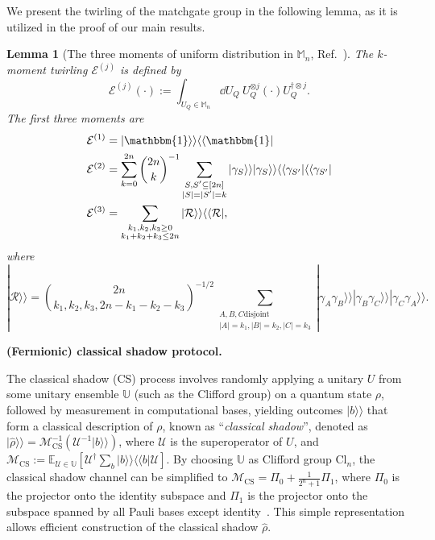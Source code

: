 \documentclass[showpacs,onecolumn,aps,prx,long bibliography,superscriptaddress,notitlepage]{revtex4-1}
\newtheorem{lemma}{Lemma}
\newcommand{\supket}[1]{|#1 \rangle\rangle}
\newcommand{\supbra}[1]{\langle\langle #1 |}
\newcommand{\sbra}[1]{\left[ #1 \right]}
\newcommand{\Ecal}{\mathcal{E}}
\newcommand{\Rcal}{\mathcal{R}}
\newcommand{\Ucal}{\mathcal{U}}
\newcommand{\Mcal}{\mathcal{M}}
\newcommand{\Ubb}{\mathbb{U}}
\newcommand{\Mbb}{\mathbb{M}}
\newcommand{\Ebb}{\mathbb{E}}
\begin{document}
We present the twirling of the matchgate group in the following lemma, as it is utilized in the proof of our main results.
\begin{lemma}[The three moments of uniform distribution in $\Mbb_n$, Ref.~\cite{wan2022matchgate}]
\label{lemma: 1}
The $k$-moment twirling $\Ecal^{(j)}$ is defined by
\begin{equation}
    \Ecal^{(j)}(\cdot):=\int_{U_Q \in \Mbb_n} \dd U_Q ~ U_Q^{\otimes j} (\cdot ) U_Q ^{\dagger \otimes j}.
\end{equation}
The first three moments are
\begin{equation}
    \begin{aligned}
        \Ecal^{(1)} &= \supket{\mathbbm{1}}\supbra{\mathbbm{1}} \\
        \Ecal^{(2)} &= \sum_{k=0}^{2n} {2n\choose k}^{-1}\sum_{\substack{S,S'\subseteq [2n] \\ |S| = |S'| = k}} \supket{\gamma_S}\supket{\gamma_S}\supbra{\gamma_{S'}}\supbra{\gamma_{S'}} \\
        \Ecal^{(3)} &= \sum_{
\substack{ k_1,k_2,k_3 \geq 0 \\ k_1 + k_2+k_3\leq 2n }}\supket{\Rcal}\supbra{\Rcal} ,
    \end{aligned}
\end{equation}
where 
\begin{equation}
    \supket{\Rcal}={2n \choose k_1,k_2,k_3, 2n - k_1-k_2-k_3}^{-1/2} \sum_{\substack{A,B,C \text{disjoint}\\
|A|=k_1,|B|=k_2, |C| = k_3
}
}\supket{\gamma_{A} \gamma_{B}}\supket{\gamma_{B} \gamma_{C}} \supket{\gamma_{C} \gamma_{A}}.
\end{equation}

\label{lem:FCS_shadow_channel}
\end{lemma}


 \vspace{8pt}
\noindent\textbf{(Fermionic) classical shadow protocol.}

The classical shadow (CS) process involves randomly applying a unitary $U$ from some unitary ensemble $\Ubb$ (such as the Clifford group) on a quantum state $\rho$, followed by measurement in computational bases, yielding outcomes $\supket{b}$ that form a classical description of $\rho$, known as ``\emph{classical shadow}'', denoted as $\supket{\hat{\rho}} = \mathcal{M}^{-1}_{\text{CS}}(\Ucal^{-1}\supket{b})$, where $\Ucal$ is the superoperator of $U$, and $\mathcal{M}_{\text{CS}}:=\Ebb_{\Ucal\in\Ubb}\sbra{\Ucal^{\dagger}\sum_{b} \supket{b}\supbra{b} \Ucal}$. By choosing $\Ubb$ as Clifford group Cl$_n$, the classical shadow channel can be simplified to $\Mcal_{\text{CS}} = \Pi_0 + \frac{1}{2^n + 1}\Pi_1$, where $\Pi_0$ is the projector onto the identity subspace and $\Pi_1$ is the projector onto the subspace spanned by all Pauli bases except identity~\cite{huang2020predicting, chen2021robust}. This simple representation allows efficient construction of the classical shadow $\hat{\rho}$.
\end{document}
